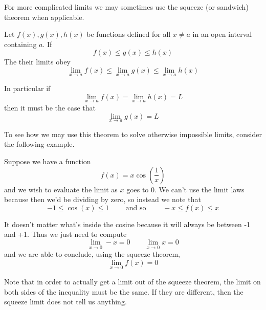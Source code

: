 For more complicated limits we may sometimes use the squeeze (or sandwich) theorem when applicable.
\begin{theorem}
	Let $f(x), g(x), h(x)$ be functions defined for all $x \neq a$ in an open interval containing $a$. If
	\[ f(x) \leq g(x) \leq h(x) \]
	The their limits obey
	\[ \lim_{x \to a} f(x) \leq \lim_{x \to a} g(x) \leq \lim_{x \to a} h(x) \]
	
	In particular if
	\[ \lim_{x \to a} f(x) = \lim_{x \to a} h(x) = L \]
	then it must be the case that
	\[ \lim_{x \to a} g(x) = L \]
\end{theorem}

To see how we may use this theorem to solve otherwise impossible limits, consider the following example.

\begin{example}
	Suppose we have a function
	\[ f(x) = x \cos(\frac{1}{x}) \]
	and we wish to evaluate the limit as $x$ goes to 0. We can't use the limit laws because then we'd be dividing by zero, so instead we note that
	\[ -1 \leq \cos(x) \leq 1 \qquad \text{ and so } \qquad -x \leq f(x) \leq x \]
	
	It doesn't matter what's inside the cosine because it will always be between -1 and +1. Thus we just need to compute
	\[ \lim_{x \to 0} -x = 0 \qquad \lim_{x \to 0} x = 0 \]
	and we are able to conclude, using the squeeze theorem,
	\[ \lim_{x \to 0} f(x) = 0 \]
\end{example}

Note that in order to actually get a limit out of the squeeze theorem, the limit on both sides of the inequality must be the same. If they are different, then the squeeze limit does not tell us anything.

